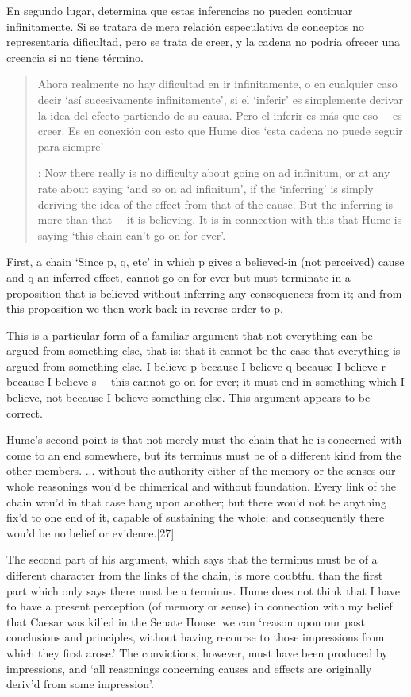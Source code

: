   En segundo lugar, determina que estas inferencias no pueden continuar
  infinitamente. Si se tratara de mera relación especulativa de conceptos no
  representaría dificultad, pero se trata de creer, y la cadena no podría ofrecer
  una creencia si no tiene término. \blockquote[{\cite[2762]{anscombe2011hoc}}:
  Now there really is no difficulty about going on ad infinitum, or at any rate
  about saying ‘and so on ad infinitum’, if the ‘inferring’ is simply deriving the
  idea of the effect from that of the cause. But the inferring is more than that
  ---it is believing. It is in connection with this that Hume is saying ‘this
  chain can’t go on for ever’.]{Ahora realmente no hay dificultad en ir
    infinitamente, o en cualquier caso decir `así sucesivamente infinitamente', si
    el `inferir' es simplemente derivar la idea del efecto partiendo de su causa.
    Pero el inferir es más que eso ---es creer. Es en conexión con esto que Hume
    dice `esta cadena no puede seguir para siempre'}

First, a chain ‘Since p, q, etc’ in which p gives a believed-in (not perceived)
cause and q an inferred effect, cannot go on for ever but must terminate in a
proposition that is believed without inferring any consequences from it; and
from this proposition we then work back in reverse order to p.

This is a particular form of a familiar argument that not everything can be
argued from something else, that is: that it cannot be the case that everything
is argued from something else. I believe p because I believe q because I believe
r because I believe s ---this cannot go on for ever; it must end in something
which I believe, not because I believe something else. This argument appears to
be correct.

Hume’s second point is that not merely must the chain that he is concerned with
come to an end somewhere, but its terminus must be of a different kind from the
other members. ... without the authority either of the memory or the senses our
whole reasonings wou’d be chimerical and without foundation. Every link of the
chain wou’d in that case hang upon another; but there wou’d not be anything
fix’d to one end of it, capable of sustaining the whole; and consequently there
wou’d be no belief or evidence.[27]


The second part of his argument, which says that the terminus must be of a
different character from the links of the chain, is more doubtful than the first
part which only says there must be a terminus. Hume does not think that I have
to have a present perception (of memory or sense) in connection with my belief
that Caesar was killed in the Senate House: we can ‘reason upon our past
conclusions and principles, without having recourse to those impressions from
which they first arose.’ The convictions, however, must have been produced by
impressions, and ‘all reasonings concerning causes and effects are originally
deriv’d from some impression’.
